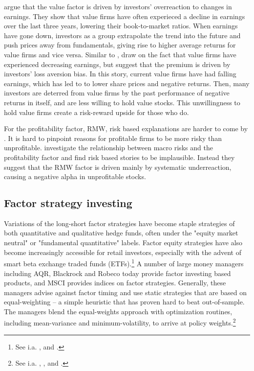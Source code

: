 \textcite{LakonishokShleiferVishny1994} argue that the value factor is driven by investors' overreaction to changes in earnings. They show that value firms have often experieced a decline in earnings over the last three years, lowering their book-to-market ratios. When earnings have gone down, investors as a group extrapolate the trend into the future and push prices away from fundamentals, giving rise to higher average returns for value firms and vice versa. Similar to \textcite{LakonishokShleiferVishny1994}, \textcite{BarberisHuang2001} draw on the fact that value firms have experienced decreasing earnings, but suggest that the premium is driven by investors' loss aversion bias. In this story, current value firms have had falling earnings, which has led to to lower share prices and negative returns. Then, many investors are deterred from value firms by the past performance of negative returns in itself, and are less willing to hold value stocks. This unwillingness to hold value firms create a risk-reward upside for those who do.

For the profitability factor, RMW, risk based explanations are harder to come by \autocite{NovyMarx2013}. It is hard to pinpoint reasons for profitable firms to be more risky than unprofitable. \textcite{Wang2013} investigate the relationship between macro risks and the profitability factor and find risk based stories to be implausible. Instead they suggest that the RMW factor is driven mainly by systematic underreaction, causing a negative alpha in unprofitable stocks.

\subsection{Factor strategy investing}
Variations of the long-short factor strategies have become staple strategies of both quantitative and qualitative hedge funds, often under the "equity market neutral" or "fundamental quantitative" labels. Factor equity strategies have also become increasingly accessible for retail investors, especially with the advent of smart beta exchange traded funds (ETFs).\footnote{See i.a. \textcite{Pedersen2015}, \textcite{AQREMN} and \textcite{McKEMN}.} A number of large money managers including AQR, Blackrock and Robeco today provide factor investing based products, and MSCI provides indices on factor strategies. Generally, these managers advise against factor timing and use static strategies that are based on equal-weighting -- a simple heuristic that has proven hard to beat out-of-sample. The managers blend the equal-weights approach with optimization routines, including mean-variance and minimum-volatility, to arrive at policy weights.\footnote{See i.a. \textcite{AQRSiren}, \textcite{BlackRock}, \textcite{MSCI} and \textcite{Robeco}.}

